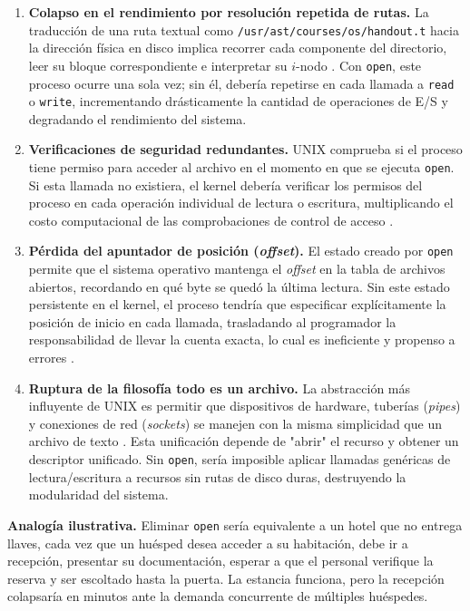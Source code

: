\documentclass[12pt,letterpaper]{article}
\begin{document}
\begin{enumerate}[leftmargin=1.5cm, label=\textbf{\arabic*.}]
\item \textbf{Colapso en el rendimiento por resolución repetida de rutas.}
  La traducción de una ruta textual como \texttt{/usr/ast/courses/os/handout.t} hacia la dirección física en
  disco implica recorrer cada componente del directorio, leer su bloque correspondiente e interpretar su $i$-nodo
  \cite{tanenbaum2015}. Con \texttt{open}, este proceso ocurre una sola vez; sin él, debería repetirse en cada
  llamada a \texttt{read} o \texttt{write}, incrementando drásticamente la cantidad de operaciones de E/S y
  degradando el rendimiento del sistema.
  
\item \textbf{Verificaciones de seguridad redundantes.}
  UNIX comprueba si el proceso tiene permiso para acceder al archivo en el momento en que se ejecuta
  \texttt{open}. Si esta llamada no existiera, el kernel debería verificar los permisos del proceso en cada
  operación individual de lectura o escritura, multiplicando el costo computacional de las comprobaciones de
  control de acceso \cite{silberschatz2018}.
  
\item \textbf{Pérdida del apuntador de posición (\textit{offset}).}
  El estado creado por \texttt{open} permite que el sistema operativo mantenga el \textit{offset} en la tabla de
  archivos abiertos, recordando en qué byte se quedó la última lectura. Sin este estado persistente en el kernel,
  el proceso tendría que especificar explícitamente la posición de inicio en cada llamada, trasladando al
  programador la responsabilidad de llevar la cuenta exacta, lo cual es ineficiente y propenso a errores
  \cite{tanenbaum2015}.
  
\item \textbf{Ruptura de la filosofía \guillemotleft{}todo es un archivo\guillemotright{}.}
  La abstracción más influyente de UNIX es permitir que dispositivos de hardware, tuberías (\textit{pipes}) y
  conexiones de red (\textit{sockets}) se manejen con la misma simplicidad que un archivo de texto
  \cite{ritchie1974}. Esta unificación depende de "abrir" el recurso y obtener un descriptor unificado.
  Sin \texttt{open}, sería imposible aplicar llamadas genéricas de lectura/escritura a recursos sin rutas de
  disco duras, destruyendo la modularidad del sistema.
\end{enumerate}

\begin{mdframed}[backgroundcolor=graybox, linecolor=accentblue, linewidth=1pt, roundcorner=4pt]
  \textbf{Analogía ilustrativa.} Eliminar \texttt{open} sería equivalente a un hotel que no entrega llaves, cada
  vez que un huésped desea acceder a su habitación, debe ir a recepción, presentar su documentación, esperar a
  que el personal verifique la reserva y ser escoltado hasta la puerta. La estancia funciona, pero la recepción
  colapsaría en minutos ante la demanda concurrente de múltiples huéspedes.
\end{mdframed}
\end{document}
